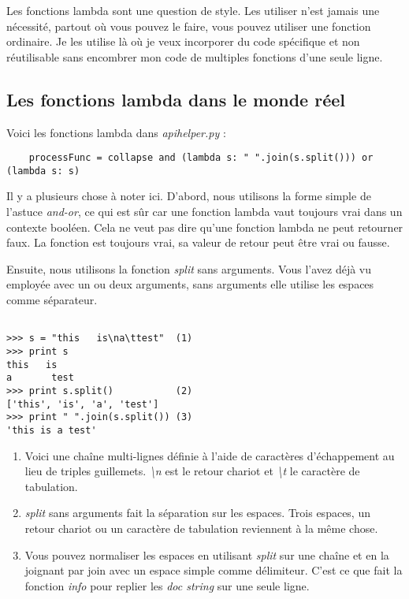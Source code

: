 {Les fonctions lambda sont une question de style. Les utiliser n’est jamais une nécessité, partout où vous pouvez le faire, vous pouvez utiliser une fonction ordinaire. Je les utilise là où je veux incorporer du code spécifique et non réutilisable sans encombrer mon code de multiples fonctions d’une seule ligne.}

\subsection{Les fonctions lambda dans le monde réel}

Voici les fonctions lambda dans \emph{apihelper.py} :

\begin{lstlisting}
    processFunc = collapse and (lambda s: " ".join(s.split())) or (lambda s: s)
\end{lstlisting}

Il y a plusieurs chose à noter ici. D’abord, nous utilisons la forme simple de l’astuce \emph{and-or}, ce qui est sûr car une fonction lambda vaut toujours vrai dans un contexte booléen. Cela ne veut pas dire qu’une fonction lambda ne peut retourner faux. La fonction est toujours vrai, sa valeur de retour peut être vrai ou fausse.

Ensuite, nous utilisons la fonction \emph{split} sans arguments. Vous l’avez déjà vu employée avec un ou deux arguments, sans arguments elle utilise les espaces comme séparateur.

\begin{example}
\begin{lstlisting}

>>> s = "this   is\na\ttest"  (1)
>>> print s
this   is
a       test
>>> print s.split()           (2)
['this', 'is', 'a', 'test']
>>> print " ".join(s.split()) (3)
'this is a test'
\end{lstlisting}
\end{example}

\begin{enumerate}
\item Voici une chaîne multi-lignes définie à l’aide de caractères d’échappement au lieu de triples guillemets. \emph{\textbackslash{}n} est le retour chariot et \emph{\textbackslash{}t} le caractère de tabulation.
\item \emph{split} sans arguments fait la séparation sur les espaces. Trois espaces, un retour chariot ou un caractère de tabulation reviennent à la même chose.
\item Vous pouvez normaliser les espaces en utilisant \emph{split} sur une chaîne et en la joignant par join avec un espace simple comme délimiteur. C’est ce que fait la fonction \emph{info} pour replier les \emph{doc string} sur une seule ligne.
\end{enumerate}


